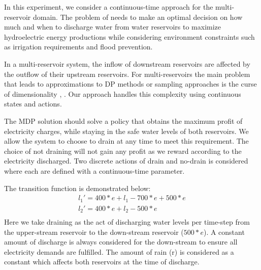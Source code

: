 In this experiment, we consider a continuous-time approach for the multi-reservoir domain. The problem of \WaterReservoir  needs to make an optimal decision on how much and when to discharge water from water reservoirs to maximize hydroelectric energy productions while considering environment constraints such as irrigation requirements and flood prevention. 

In a multi-reservoir system, the inflow of downstream reservoirs are affected by the outflow of their upstream reservoirs. 
For multi-reservoirs the main problem that leads to approximations to DP methods or sampling approaches is the curse of dimensionality \cite{Mahootchi2009}, \cite{Yeh1985}. Our approach handles this complexity using continuous states and actions.


The MDP solution should solve a policy that obtains the maximum profit of electricity charges, while staying in the safe water levels of both reservoirs. We allow the system to choose to drain at any time to meet this requirement. The choice of not draining will not gain any profit as we reward according to the electricity discharged. Two discrete actions of drain and no-drain is considered where each are defined with a continuous-time parameter. 

The transition function is demonstrated below: 
{\footnotesize
\begin{align*}
l_1'  = 400 * e + l_1 -700 * e + 500 * e \\
l_2'  = 400 * e + l_2 - 500 * e \\
\end{align*}
}
Here we take draining as the act of discharging water levels per time-step from the upper-stream reservoir to the down-stream reservoir ($500 * e$). A constant amount of discharge is always considered for the down-stream to ensure all electricity demands are fulfilled.  The amount of rain (r) is considered as a constant which affects both reservoirs at the time of discharge. 

